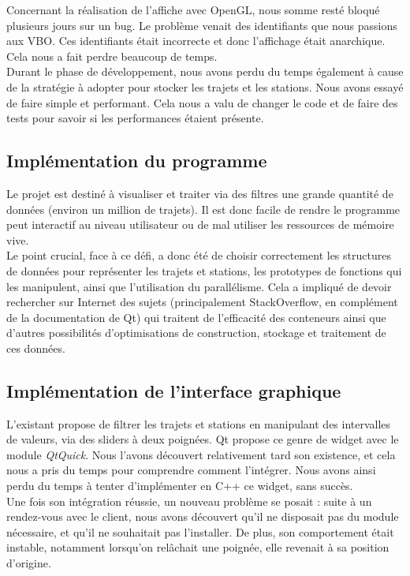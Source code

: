\documentclass[12pt]{article}
\begin{document}
	Concernant la réalisation de l’affiche avec OpenGL, nous somme resté bloqué plusieurs jours
	sur un bug. Le problème venait des identifiants que nous passions aux VBO. Ces identifiants
	était incorrecte et donc l'affichage était anarchique.
	Cela nous a fait perdre beaucoup de temps.\\

	Durant le phase de développement, nous avons perdu du temps également à cause de la
	stratégie à adopter pour stocker les trajets et les stations. Nous avons essayé de faire
	simple et performant. Cela nous a valu de changer le code et de faire des tests pour savoir
	si les performances étaient présente.
	
	
		\subsection{Implémentation du programme}
		Le projet est destiné à visualiser et traiter via des filtres une grande quantité de données (environ un million de trajets). Il est donc facile de rendre le programme peut interactif au niveau utilisateur ou de mal utiliser les ressources de mémoire vive.\\

Le point crucial, face à ce défi, a donc été de choisir correctement les structures de données pour représenter les trajets et stations, les prototypes de fonctions qui les manipulent, ainsi que l’utilisation du parallélisme. Cela a impliqué de devoir rechercher sur Internet des sujets (principalement StackOverflow, en complément de la documentation de Qt) qui traitent de l’efficacité des conteneurs ainsi que d’autres possibilités d’optimisations de construction, stockage et traitement de ces données.
		
		
		\subsection{Implémentation de l’interface graphique}	
		L’existant propose de filtrer les trajets et stations en manipulant des intervalles de valeurs, via des sliders à deux poignées. Qt propose ce genre de widget avec le module \textit{QtQuick}. Nous l’avons découvert relativement tard son existence, et cela nous a pris du temps pour comprendre comment l'intégrer. Nous avons ainsi perdu du temps à tenter d’implémenter en C++ ce widget, sans succès.\\
	
		Une fois son intégration réussie, un nouveau problème se posait : suite à un rendez-vous avec le client, nous avons découvert qu’il ne disposait pas du module nécessaire, et qu’il ne souhaitait pas l’installer. De plus, son comportement était instable, notamment lorsqu’on relâchait une poignée, elle revenait à sa position d’origine.\\
	
\end{document}
